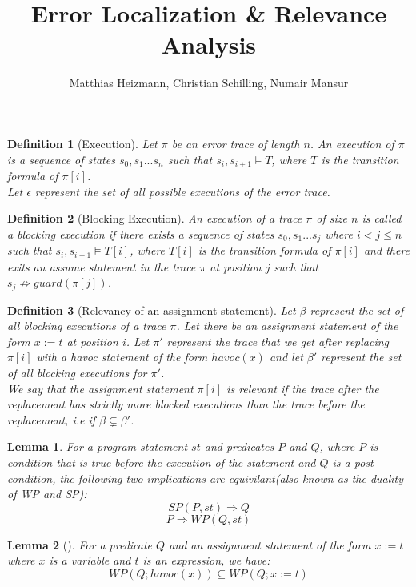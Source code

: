 \documentclass{article}
\title{Error Localization \& Relevance Analysis \\ }
\author{Matthias Heizmann, Christian Schilling, Numair Mansur}
\affil{University of Freiburg, Germany}
\date{\vspace{-5ex}}
\newcommand{\limp}{\Rightarrow}
\newtheorem{mydef}{Definition}
\newtheorem{lemma}{Lemma}
\begin{document}
\maketitle

\begin{mydef}[Execution]\label{mydef:execution_definition}
Let $\pi$ be an error trace of length $n$. An execution of $\pi$ is a sequence of states $s_0, s_1...s_n$ such that $s_i, s_{i+1} \models T$, where $T$ is the transition formula of $\pi[i]$. \\
Let $\epsilon$ represent the set of all possible executions of the error trace.
\end{mydef}

\begin{mydef}[Blocking Execution]\label{mydef:blockingexecution_definition}
An execution of a trace $\pi$ of size $n$ is called a blocking execution if there exists a sequence of states $s_0, s_1...s_j$ where $i<j \leq n$ such that $s_i, s_{i+1} \models T[i]$, where $T[i]$ is the transition formula of $\pi[i]$ and there exits an assume statement in the trace $\pi$ at position $j$ such that $s_{j} \not \limp guard(\pi[j])$.
\end{mydef}

\begin{mydef}[Relevancy of an assignment statement]\label{mydef:relevancy_definition}
Let $\beta$ represent the set of all blocking executions of a trace $\pi$. Let there be an assignment statement of the form $x:=t$ at position $i$. Let $\pi'$ represent the trace that we get after replacing $\pi[i]$ with a havoc statement of the form $havoc(x)$ and let $\beta'$ represent the set of all blocking executions for $\pi'$.\\
We say that the assignment statement $\pi[i]$ is relevant if the trace after the replacement has strictly more blocked executions than the trace before the replacement, i.e if $\beta \subsetneq \beta'$. 
\end{mydef}

\begin{lemma}\label{lemma:duality}
For a program statement $st$ and predicates $P$ and $Q$, where $P$ is condition that is true before the execution of the statement and $Q$ is a post condition, the following two implications are equivilant(also known as the duality of WP and SP):
$$SP(P,st) \Rightarrow Q$$
$$P \Rightarrow WP(Q,st)$$
\end{lemma}

\begin{lemma}[]\label{lemma:rel_bw_assignment_and_havoc}
For a predicate $Q$ and an assignment statement of the form $x:=t$ where $x$ is a variable and $t$ is an expression, we have:
$$WP(Q; havoc(x)) \subseteq WP(Q; x:=t)$$
\end{lemma}
\end{document}
